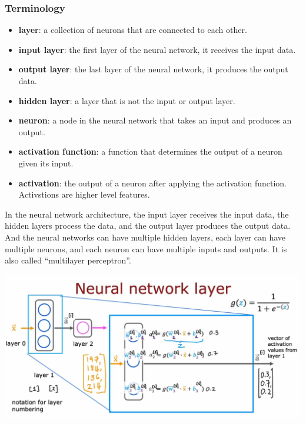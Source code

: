 \subsubsection*{Terminology}
\begin{itemize}
    \item \textbf{layer}: a collection of neurons that are connected to each other.
    \item \textbf{input layer}: the first layer of the neural network, it receives the input data.
    \item \textbf{output layer}: the last layer of the neural network, it produces the output data.
    \item \textbf{hidden layer}: a layer that is not the input or output layer.
    \item \textbf{neuron}: a node in the neural network that takes an input and produces an output.
    \item \textbf{activation function}: a function that determines the output of a neuron given its input.
    \item \textbf{activation}: the output of a neuron after applying the activation function. 
    Activstions are higher level features.
\end{itemize}

\begin{notebox}
    \hspace{2em}In the neural network architecture, the input layer receives the input data, the hidden layers process the data, and the output layer produces the output data.
    And the neural networks can have multiple hidden layers, each layer can have multiple neurons, and each neuron can have multiple inputs and outputs.
    It is also called ``multilayer perceptron''. 
\end{notebox}
\includegraphics[width=\textwidth]{images/8.1}

